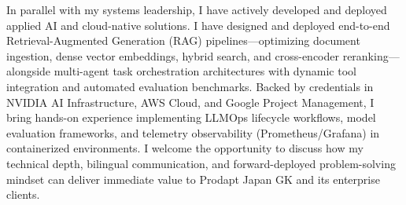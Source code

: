\documentclass[11pt, a4paper]{awesome-cv}
\begin{document}
\begin{cvletter}
In parallel with my systems leadership, I have actively developed and deployed applied AI and cloud-native solutions. I have designed and deployed end-to-end Retrieval-Augmented Generation (RAG) pipelines---optimizing document ingestion, dense vector embeddings, hybrid search, and cross-encoder reranking---alongside multi-agent task orchestration architectures with dynamic tool integration and automated evaluation benchmarks. Backed by credentials in NVIDIA AI Infrastructure, AWS Cloud, and Google Project Management, I bring hands-on experience implementing LLMOps lifecycle workflows, model evaluation frameworks, and telemetry observability (Prometheus/Grafana) in containerized environments. I welcome the opportunity to discuss how my technical depth, bilingual communication, and forward-deployed problem-solving mindset can deliver immediate value to Prodapt Japan GK and its enterprise clients.

\end{cvletter}


\makeletterclosing
\end{document}
